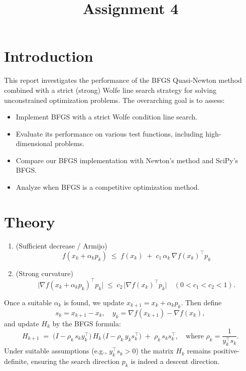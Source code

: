 \documentclass[a4paper,12pt]{article}
\title{Assignment 4}
\begin{document}
\maketitle

\section{Introduction}


This report investigates the performance of the BFGS Quasi-Newton method combined with a strict (strong) Wolfe line search strategy for solving unconstrained optimization problems. The overarching goal is to assess:
\begin{itemize}
    \item Implement BFGS with a strict Wolfe condition line search.
    \item Evaluate its performance on various test functions, including high-dimensional problems.
    \item Compare our BFGS implementation with Newton's method and SciPy's BFGS.
    \item Analyze when BFGS is a competitive optimization method.
\end{itemize}



\section{Theory}


\begin{enumerate}
    \item (Sufficient decrease / Armijo) 
    \[
       f(x_k + \alpha_k p_k) \;\le\; f(x_k) \;+\; c_1 \,\alpha_k\, \nabla f(x_k)^\top p_k
    \]
    \item (Strong curvature) 
    \[
       \bigl|\nabla f(x_k + \alpha_k p_k)^\top p_k\bigr| \;\le\; c_2\, \bigl|\nabla f(x_k)^\top p_k\bigr|\quad(0 < c_1 < c_2 < 1).
    \]
\end{enumerate}
Once a suitable $\alpha_k$ is found, we update $x_{k+1} = x_k + \alpha_k p_k$. Then define 
\[
s_k = x_{k+1} - x_k, \quad
y_k = \nabla f(x_{k+1}) - \nabla f(x_k),
\]
and update $H_k$ by the BFGS formula:
\[
   H_{k+1} \;=\; \bigl(I - \rho_k\, s_k y_k^\top\bigr)\,H_k \,\bigl(I - \rho_k\, y_k s_k^\top\bigr) \;+\; \rho_k\, s_k s_k^\top,
   \quad \text{where } \rho_k = \frac{1}{y_k^\top s_k}.
\]
Under suitable assumptions (e.g., $y_k^\top s_k > 0$) the matrix $H_k$ remains positive-definite, ensuring the search direction $p_k$ is indeed a descent direction.
\end{document}

